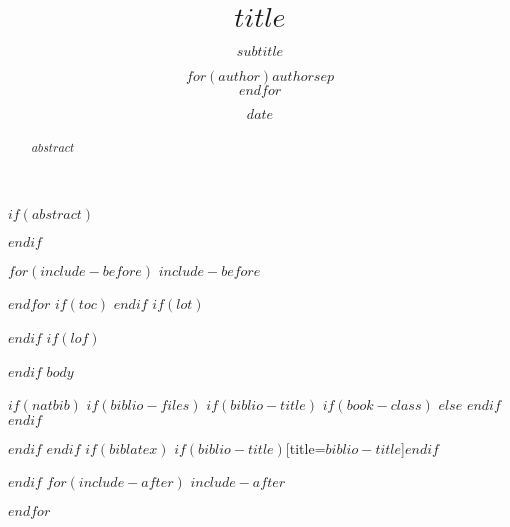 \documentclass[12pt,a4paper]{$documentclass$}
\title{$title$}
\title{}
\author{$for(author)$$author$$sep$ \\ $endfor$}
\author{}
\date{$date$}
\date{}
\subtitle{$subtitle$}
\begin{document}
\maketitle

$if(abstract)$
\begin{abstract}
$abstract$
\end{abstract}
$endif$

$for(include-before)$
$include-before$

$endfor$
$if(toc)$
{
\hypersetup{linkcolor=black}
\setcounter{tocdepth}{$toc-depth$}
\tableofcontents
}
$endif$
$if(lot)$
\listoftables
$endif$
$if(lof)$
\listoffigures
$endif$
$body$

$if(natbib)$
$if(biblio-files)$
$if(biblio-title)$
$if(book-class)$
\renewcommand\bibname{$biblio-title$}
$else$
\renewcommand\refname{$biblio-title$}
$endif$
$endif$


$endif$
$endif$
$if(biblatex)$
\printbibliography$if(biblio-title)$[title=$biblio-title$]$endif$

$endif$
$for(include-after)$
$include-after$

$endfor$
\end{document}

